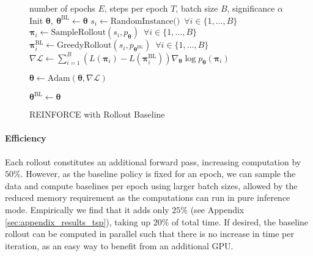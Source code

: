 \begin{wrapfigure}{R}{0.50\linewidth}
\begin{minipage}[t][4.5cm]{0.5\textwidth}
\vskip -0.8cm
\begin{algorithm}[H]
  \centering
  
  \scriptsize
  \caption{REINFORCE with Rollout Baseline} \label{alg:reinforce_rollout}
  \begin{algorithmic}[1]
  	   number of epochs $E$, steps per epoch $T$, batch size $B$, significance $\alpha$
      \STATE Init $\bm{\theta},\ \bm{\theta}^{\text{BL}} \gets \bm{\theta}$
        	\STATE $s_i \gets \text{RandomInstance()} \enspace \forall i \in \{1, \ldots, B\}$
            \STATE $\bm{\pi}_i \gets \text{SampleRollout}(s_i, p_{\bm{\theta}}) \enspace \forall i \in \{1, \ldots, B\}$
            \STATE $\bm{\pi}_i^{\text{BL}} \gets \text{GreedyRollout}(s_i, p_{\bm{\theta}^{\text{BL}}}) \enspace \forall i \in \{1, \ldots, B\}$
            \STATE $\nabla\mathcal{L} \gets \sum_{i=1}^{B} \left(L(\bm{\pi}_i) - L(\bm{\pi}_i^{\text{BL}})\right) \nabla_{\bm{\theta}} \log p_{\bm{\theta}}(\bm{\pi}_i)$
            
          	\STATE $\bm{\theta} \gets \text{Adam}(\bm{\theta}, \nabla\mathcal{L})$
        \ENDFOR
        
		\STATE $\bm{\theta}^{\text{BL}} \gets \bm{\theta}$
      \ENDIF
     \ENDFOR
  \end{algorithmic}
\end{algorithm}
\end{minipage}
\end{wrapfigure}

\paragraph{Efficiency}
Each rollout constitutes an additional forward pass, increasing computation by $50\%$. However, as the baseline policy is fixed for an epoch, we can sample the data and compute baselines per epoch using larger batch sizes, allowed by the reduced memory requirement as the computations can run in pure inference mode. Empirically we find that it adds only $25\%$ (see Appendix \ref{sec:appendix_results_tsp}), taking up $20\%$ of total time. If desired, the baseline rollout can be computed in parallel such that there is no increase in time per iteration, as an easy way to benefit from an additional GPU.

